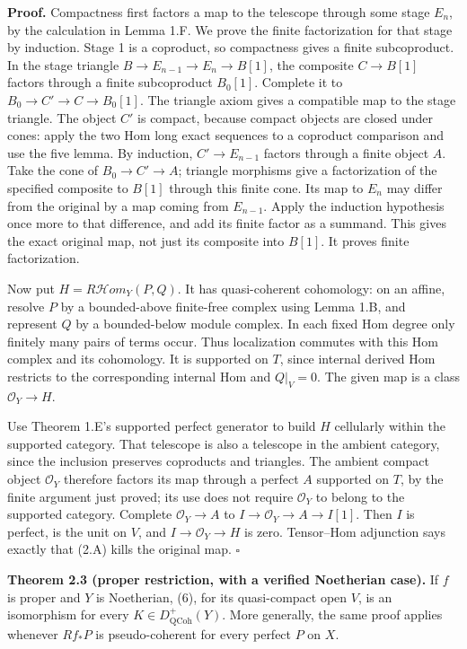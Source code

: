 \documentclass[11pt]{article}
\begin{document}
\textbf{Proof.} Compactness first factors a map to the telescope through
some stage \(E_n\), by the calculation in Lemma 1.F. We prove the finite
factorization for that stage by induction. Stage 1 is a coproduct, so
compactness gives a finite subcoproduct. In the stage triangle
\(B\to E_{n-1}\to E_n\to B[1]\), the composite \(C\to B[1]\) factors
through a finite subcoproduct \(B_0[1]\). Complete it to
\(B_0\to C'\to C\to B_0[1]\). The triangle axiom gives a compatible map
to the stage triangle. The object \(C'\) is compact, because compact
objects are closed under cones: apply the two Hom long exact sequences
to a coproduct comparison and use the five lemma. By induction,
\(C'\to E_{n-1}\) factors through a finite object \(A\). Take the cone
of \(B_0\to C'\to A\); triangle morphisms give a factorization of the
specified composite to \(B[1]\) through this finite cone. Its map to
\(E_n\) may differ from the original by a map coming from \(E_{n-1}\).
Apply the induction hypothesis once more to that difference, and add its
finite factor as a summand. This gives the exact original map, not just
its composite into \(B[1]\). It proves finite factorization.

Now put \(H=R\mathcal H om_Y(P,Q)\). It has quasi-coherent cohomology:
on an affine, resolve \(P\) by a bounded-above finite-free complex using
Lemma 1.B, and represent \(Q\) by a bounded-below module complex. In
each fixed Hom degree only finitely many pairs of terms occur. Thus
localization commutes with this Hom complex and its cohomology. It is
supported on \(T\), since internal derived Hom restricts to the
corresponding internal Hom and \(Q|_V=0\). The given map is a class
\(\mathcal O_Y\to H\).

Use Theorem 1.E's supported perfect generator to build \(H\) cellularly
within the supported category. That telescope is also a telescope in the
ambient category, since the inclusion preserves coproducts and
triangles. The ambient compact object \(\mathcal O_Y\) therefore factors
its map through a perfect \(A\) supported on \(T\), by the finite
argument just proved; its use does not require \(\mathcal O_Y\) to
belong to the supported category. Complete \(\mathcal O_Y\to A\) to
\(I\to\mathcal O_Y\to A\to I[1]\). Then \(I\) is perfect, is the unit on
\(V\), and \(I\to\mathcal O_Y\to H\) is zero. Tensor--Hom adjunction
says exactly that (2.A) kills the original map. \(\square\)

\textbf{Theorem 2.3 (proper restriction, with a verified Noetherian
case).} If \(f\) is proper and \(Y\) is Noetherian, (6), for its
quasi-compact open \(V\), is an isomorphism for every
\(K\in D^+_{\mathrm{QCoh}}(Y)\). More generally, the same proof applies
whenever \(Rf_*P\) is pseudo-coherent for every perfect \(P\) on \(X\).
\end{document}
